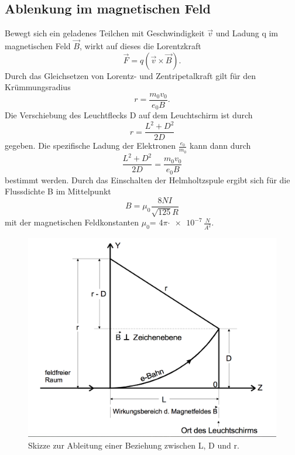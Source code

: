 \subsection{Ablenkung im magnetischen Feld}
Bewegt sich ein geladenes Teilchen mit Geschwindigkeit $\vec{v}$ und Ladung q im magnetischen Feld $\vec{B}$, wirkt auf dieses die Lorentzkraft
\begin{equation}
  \vec{F} = q (\vec{v} \times \vec{B}).
\end{equation}
Durch das Gleichsetzen von Lorentz- und Zentripetalkraft gilt für den Krümmungsradius
\begin{equation}
  r = \frac{m_0v_0}{e_0B}.
\end{equation}
Die Verschiebung des Leuchtflecks D auf dem Leuchtschirm ist durch
\begin{equation}
  r = \frac{L^2 + D^2}{2D}
\end{equation}
gegeben. Die spezifische Ladung der Elektronen $\frac{e_0}{m_0}$ kann dann durch
\begin{equation}
  \frac{L^2 + D^2}{2D} = \frac{m_0v_0}{e_0B}
  \label{eqn:ladung}
\end{equation}
bestimmt werden.
\newline
Durch das Einschalten der Helmholtzspule ergibt sich für die Flussdichte B im Mittelpunkt
\begin{equation}
 B = \mu_0\frac{8NI}{\sqrt{125}R}
 \label{eqn:hh}
\end{equation}
\newline
mit der magnetischen Feldkonstanten $\mu_0$= 4$\pi$$\cdot\num{e-7}$\,$\frac{N}{A^2}$.
\begin{figure}
 \centering
  \includegraphics[scale=0.4]{ablenkungm.png}
  \caption{Skizze zur Ableitung einer Beziehung zwischen L, D und r.\cite{Anleitung}}
  \label{fig:aufbaum}
\end{figure}
\newpage
